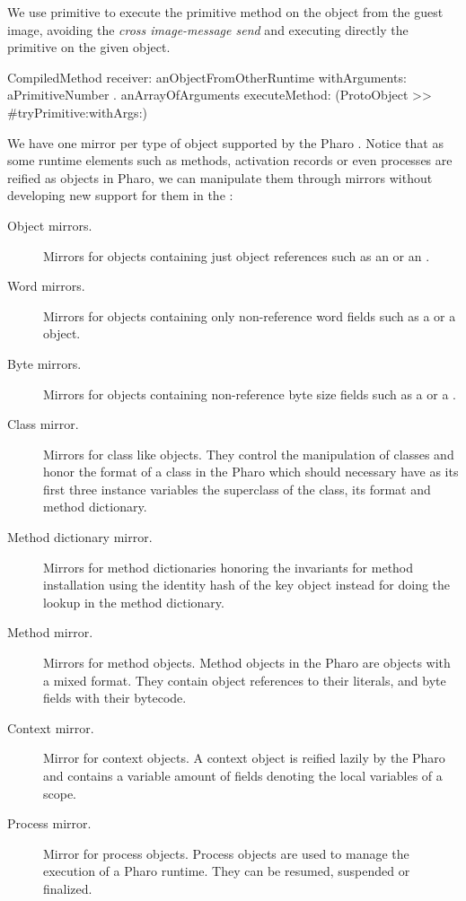 We use primitive  to execute the primitive method  on the object from the guest image, avoiding the \emph{cross image-message send} and executing directly the primitive on the given object.

\begin{code}
CompiledMethod
       receiver: anObjectFromOtherRuntime
       withArguments: { aPrimitiveNumber . anArrayOfArguments }
       executeMethod: (ProtoObject >> #tryPrimitive:withArgs:)
\end{code}

We have one mirror per type of object supported by the Pharo \VM. Notice that as some runtime elements such as methods, activation records or even processes are reified as objects in Pharo, we can manipulate them through mirrors without developing new support for them in the \VM:

\begin{description}
\item[Object mirrors.] Mirrors for objects containing just object references such as an  or an .
\item[Word mirrors.] Mirrors for objects containing only non-reference word fields such as a  or a  object.
\item[Byte mirrors.] Mirrors for objects containing non-reference byte size fields such as a  or a . 
\item[Class mirror.] Mirrors for class like objects. They control the manipulation of classes and honor the format of a class in the Pharo \VM which should necessary have as its first three instance variables the superclass of the class, its format and method dictionary.
\item[Method dictionary mirror.] Mirrors for method dictionaries honoring the \VM invariants for method installation \ie using the identity hash of the key object instead for doing the lookup in the method dictionary.
\item[Method mirror.] Mirrors for method objects. Method objects in the Pharo \VM are objects with a mixed format. They contain object references to their literals, and byte fields with their bytecode.
\item[Context mirror.] Mirror for context objects. A context object is reified lazily by the Pharo \VM and contains a variable amount of fields denoting the local variables of a scope.
\item[Process mirror.] Mirror for process objects. Process objects are used to manage the execution of a Pharo runtime. They can be resumed, suspended or finalized.
\end{description}


